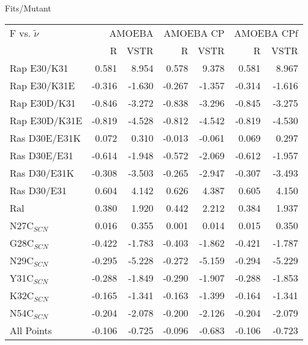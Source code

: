 \documentclass[]{article}
\begin{document}
Fits/Mutant \\
{
\begin{tabular}{ l || r r| r r| r r}
F vs. $\tilde \nu$ & \multicolumn{2}{|C{2cm}}{AMOEBA} & \multicolumn{2}{|C{2cm}}{AMOEBA CP} & \multicolumn{2}{|C{2cm}}{AMOEBA CPf} \\
 & \multicolumn{1}{|C{1cm}}{R} & \multicolumn{1}{C{1cm}}{VSTR} & \multicolumn{1}{|C{1cm}}{R} & \multicolumn{1}{C{1cm}}{VSTR} & \multicolumn{1}{|C{1cm}}{R} & \multicolumn{1}{C{1cm}}{VSTR} \\
\hline\hline
Rap E30/K31    & 0.581          & 8.954          & 0.578          & 9.378          & 0.581          & 8.967         \\
Rap E30/K31E   & -0.316         & -1.630         & -0.267         & -1.357         & -0.314         & -1.616        \\
Rap E30D/K31   & -0.846         & -3.272         & -0.838         & -3.296         & -0.845         & -3.275        \\
Rap E30D/K31E  & -0.819         & -4.528         & -0.812         & -4.542         & -0.819         & -4.530        \\
Ras D30E/E31K  & 0.072          & 0.310          & -0.013         & -0.061         & 0.069          & 0.297         \\
Ras D30E/E31   & -0.614         & -1.948         & -0.572         & -2.069         & -0.612         & -1.957        \\
Ras D30/E31K   & -0.308         & -3.503         & -0.265         & -2.947         & -0.307         & -3.493        \\
Ras D30/E31    & 0.604          & 4.142          & 0.626          & 4.387          & 0.605          & 4.150         \\
Ral            & 0.380          & 1.920          & 0.442          & 2.212          & 0.384          & 1.937         \\
\hline
N27C$_{SCN}$   & 0.016          & 0.355          & 0.001          & 0.014          & 0.015          & 0.350         \\
G28C$_{SCN}$   & -0.422         & -1.783         & -0.403         & -1.862         & -0.421         & -1.787        \\
N29C$_{SCN}$   & -0.295         & -5.228         & -0.272         & -5.159         & -0.294         & -5.229        \\
Y31C$_{SCN}$   & -0.288         & -1.849         & -0.290         & -1.907         & -0.288         & -1.853        \\
K32C$_{SCN}$   & -0.165         & -1.341         & -0.163         & -1.399         & -0.164         & -1.341        \\
N54C$_{SCN}$   & -0.204         & -2.078         & -0.200         & -2.126         & -0.204         & -2.079        \\
\hline
All Points     & -0.106         & -0.725         & -0.096         & -0.683         & -0.106         & -0.723        \\
\end{tabular}\\
}\\
\end{document}
